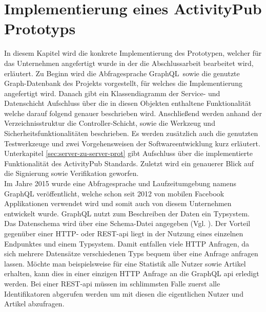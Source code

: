 
\chapter{Implementierung eines ActivityPub Prototyps}
In diesem Kapitel wird die konkrete Implementierung des Prototypen, welcher für das Unternehmen angefertigt wurde in der die Abschlussarbeit bearbeitet wird, erläutert. Zu Beginn wird die Abfragesprache \glqq GraphQL\grqq~sowie die genutzte Graph-Datenbank des Projekts vorgestellt, für welches die Implementierung angefertigt wird. Danach gibt ein Klassendiagramm der Service- und Datenschicht Aufschluss über die in diesen Objekten enthaltene Funktionalität welche darauf folgend genauer beschrieben wird. Anschließend werden anhand der Verzeichnisstruktur die Controller-Schicht, sowie die Werkzeug und Sicherheitsfunktionalitäten beschrieben. Es werden zusätzlich auch die genutzten Testwerkzeuge und zwei Vorgehensweisen der Softwareentwicklung kurz erläutert. Unterkapitel \ref{sec:server-zu-server-prot} gibt Aufschluss über die implementierte Funktionalität des ActivityPub Standards. Zuletzt wird ein genauerer Blick auf die Signierung sowie Verifikation geworfen.\\

Im Jahre 2015 wurde eine Abfragesprache und Laufzeitumgebung namens GraphQL veröffentlicht, welche schon seit 2012 von mobilen Facebook Applikationen verwendet wird und somit auch von diesem Unternehmen entwickelt wurde. GraphQL nutzt zum Beschreiben der Daten ein Typsystem. Das Datenschema wird über eine Schema-Datei angegeben (Vgl. \cite{graphql}). Der Vorteil gegenüber einer HTTP- oder REST-\gls{api} liegt in der Nutzung eines einzelnen Endpunktes und einem Typsystem. Damit entfallen viele HTTP Anfragen, da sich mehrere Datensätze verschiedenen Typs bequem über eine Anfrage anfragen lassen. Möchte man beispielsweise für eine Statistik alle Nutzer sowie Artikel erhalten, kann dies in einer einzigen HTTP Anfrage an die GraphQL \gls{api} erledigt werden. Bei einer REST-\gls{api} müssen im schlimmsten Falle zuerst alle Identifikatoren abgerufen werden um mit diesen die eigentlichen Nutzer und Artikel abzufragen.\\

